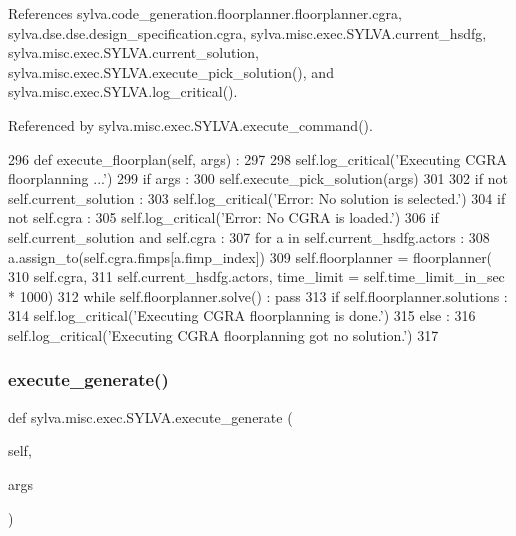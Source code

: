References sylva.\+code\+\_\+generation.\+floorplanner.\+floorplanner.\+cgra, sylva.\+dse.\+dse.\+design\+\_\+specification.\+cgra, sylva.\+misc.\+exec.\+S\+Y\+L\+V\+A.\+current\+\_\+hsdfg, sylva.\+misc.\+exec.\+S\+Y\+L\+V\+A.\+current\+\_\+solution, sylva.\+misc.\+exec.\+S\+Y\+L\+V\+A.\+execute\+\_\+pick\+\_\+solution(), and sylva.\+misc.\+exec.\+S\+Y\+L\+V\+A.\+log\+\_\+critical().



Referenced by sylva.\+misc.\+exec.\+S\+Y\+L\+V\+A.\+execute\+\_\+command().


\begin{DoxyCode}
296   \textcolor{keyword}{def }execute\_floorplan(self, args) :
297 
298     self.log\_critical(\textcolor{stringliteral}{'Executing CGRA floorplanning ...'})
299     \textcolor{keywordflow}{if} args :
300       self.execute\_pick\_solution(args)
301 
302     \textcolor{keywordflow}{if} \textcolor{keywordflow}{not} self.current\_solution :
303       self.log\_critical(\textcolor{stringliteral}{'Error: No solution is selected.'})
304     \textcolor{keywordflow}{if} \textcolor{keywordflow}{not} self.cgra :
305       self.log\_critical(\textcolor{stringliteral}{'Error: No CGRA is loaded.'})
306     \textcolor{keywordflow}{if} self.current\_solution \textcolor{keywordflow}{and} self.cgra :
307       \textcolor{keywordflow}{for} a \textcolor{keywordflow}{in} self.current\_hsdfg.actors :
308         a.assign\_to(self.cgra.fimps[a.fimp\_index])
309       self.floorplanner = floorplanner(
310         self.cgra,
311         self.current\_hsdfg.actors, time\_limit = self.time\_limit\_in\_sec * 1000)
312       \textcolor{keywordflow}{while} self.floorplanner.solve() : \textcolor{keywordflow}{pass}
313       \textcolor{keywordflow}{if} self.floorplanner.solutions :
314         self.log\_critical(\textcolor{stringliteral}{'Executing CGRA floorplanning is done.'})
315       \textcolor{keywordflow}{else} :
316         self.log\_critical(\textcolor{stringliteral}{'Executing CGRA floorplanning got no solution.'})
317 
\end{DoxyCode}
\mbox{\label{classsylva_1_1misc_1_1exec_1_1_s_y_l_v_a_a11805867dcb2df10927531d78d9c26ca}} 
\subsubsection{\texorpdfstring{execute\+\_\+generate()}{execute\_generate()}}
{\footnotesize\ttfamily def sylva.\+misc.\+exec.\+S\+Y\+L\+V\+A.\+execute\+\_\+generate (\begin{DoxyParamCaption}\item[{}]{self,  }\item[{}]{args }\end{DoxyParamCaption})}



